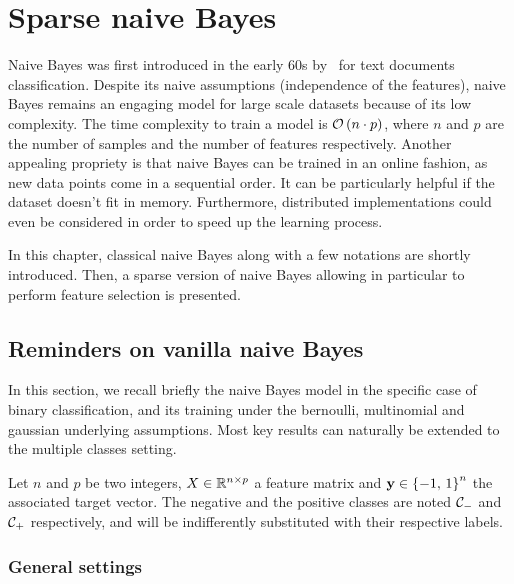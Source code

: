 \chapter{Sparse naive Bayes}\label{ch:snb}

Naive Bayes was first introduced in the early 60s by~\cite{original_naive_bayes} for text documents classification.
Despite its naive assumptions (independence of the features),
naive Bayes remains an engaging model for large scale datasets because of its low complexity.
The time complexity to train a model is $\mathcal{O}\left( n \cdot p \right)$, where $n$ and $p$ are the number of
samples and the number of features respectively.
Another appealing propriety is that naive Bayes can be trained in an online fashion,
as new data points come in a sequential order.
It can be particularly helpful if the dataset doesn't fit in memory.
Furthermore, distributed implementations could even be considered in order to speed up the learning process.

In this chapter, classical naive Bayes along with a few notations are shortly introduced.
Then, a sparse version of naive Bayes allowing in particular to perform feature selection is presented.

\section{Reminders on vanilla naive Bayes}\label{sec:naive_bayes}

In this section, we recall briefly the naive Bayes model in the specific case of binary classification,
and its training under the bernoulli, multinomial and gaussian underlying assumptions.
Most key results can naturally be extended to the multiple classes setting.

Let $n$ and $p$ be two integers, $X \in \mathbb{R}^{n \times p}$ a feature matrix
and $\mathbf{y} \in \left\{ -1,\, 1 \right\}^n$ the associated target vector.
The negative and the positive classes are noted $\mathcal{C}_-$ and $\mathcal{C}_+$ respectively,
and will be indifferently substituted with their respective labels.

\subsection{General settings}\label{subsec:nb_general}

